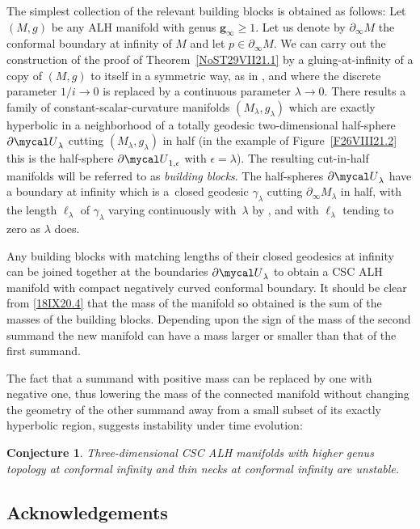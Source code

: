 \documentclass[pdftex]{sigma}
\numberwithin{equation}{section}
\newtheorem{Conjecture}[Theorem]{Conjecture}
 { \theoremstyle{definition}
\newtheorem{Definition}[Theorem]{Definition}
\newtheorem{Note}[Theorem]{Note}
\newtheorem{Example}[Theorem]{Example}
\newtheorem{Remark}[Theorem]{Remark} }
\newcommand{\mcU}{{\mycal U}}
\begin{document}
The simplest collection of the relevant building blocks is obtained as follows: Let $(M,g)$ be any ALH manifold with genus $\mathbf{g}_{\infty} \ge 1$. Let us denote by $\partial_\infty M$ the conformal boundary at infinity of $M$ and let $p\in \partial_\infty M$. We can carry out the construction of the proof of Theorem~\ref{NoST29VII21.1} by a gluing-at-infinity of a copy of $(M,g)$ to itself in a symmetric way, as in \cite{CDW},
and where the discrete parameter $1/i\to 0$ is replaced by a continuous parameter $\lambda \to 0$. There results a family of constant-scalar-curvature manifolds $(M_\lambda, g_\lambda)$ which are exactly hyperbolic in a neighborhood of a
totally geodesic two-dimensional half-sphere $\partial \mcU_{\lambda}$
 cutting $(M_\lambda,g_\lambda) $ in half
(in the example of Figure~\ref{F26VIII21.2} this is the half-sphere $\partial \mcU_{1,\epsilon} $ with $\epsilon=\lambda$). The resulting cut-in-half manifolds will be referred to as \emph{building blocks}.
The half-spheres $\partial \mcU_{\lambda}$ have a boundary at infinity which is a~closed geodesic $\gamma_\lambda$ cutting $\partial_\infty M_\lambda $
 in half, with the length $\ell_\lambda$ of $\gamma_\lambda$ varying continuously with~$\lambda$ by \cite[Remark~5.11]{CDW}, and with $\ell_\lambda$ tending to zero as $\lambda$ does.

Any building blocks with matching lengths of their closed geodesics at infinity can be joined together at the boundaries $\partial \mcU_{\lambda}$ to obtain a CSC ALH manifold with compact negatively curved conformal boundary. It should be clear from \eqref{18IX20.4} that the mass of the manifold so obtained
is the sum of the masses of the building blocks. Depending upon the sign of the mass of the second summand the new manifold can have a mass larger or smaller than that of the first summand.

The fact that a summand with positive mass can be replaced by one with negative one, thus lowering the mass of the connected manifold without changing the geometry of the other summand away from a small subset of its exactly hyperbolic region, suggests instability under time evolution:

\begin{Conjecture} \label{C12VI22.1}
 Three-dimensional CSC ALH manifolds with higher genus topology at conformal infinity and thin necks at conformal infinity are unstable.
\end{Conjecture}

\subsection*{Acknowledgements}
\end{document}
